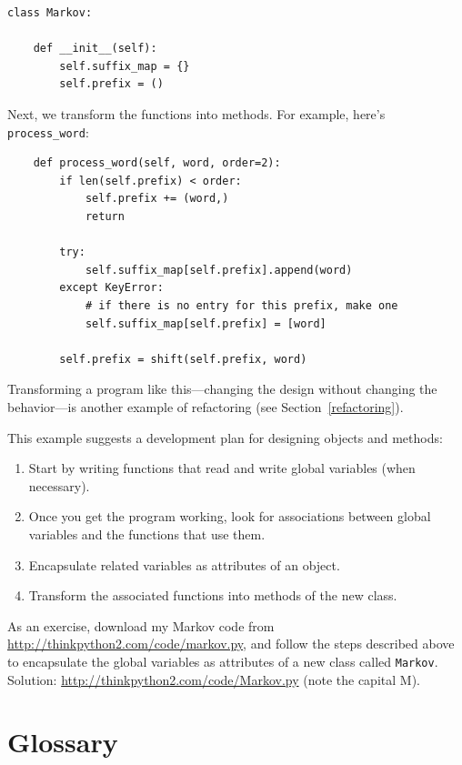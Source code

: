 \documentclass[10pt]{book}
\begin{document}
\begin{verbatim}
class Markov:

    def __init__(self):
        self.suffix_map = {}
        self.prefix = ()    
\end{verbatim}

Next, we transform the functions into methods.  For example,
here's \verb"process_word":

\begin{verbatim}
    def process_word(self, word, order=2):
        if len(self.prefix) < order:
            self.prefix += (word,)
            return

        try:
            self.suffix_map[self.prefix].append(word)
        except KeyError:
            # if there is no entry for this prefix, make one
            self.suffix_map[self.prefix] = [word]

        self.prefix = shift(self.prefix, word)        
\end{verbatim}

Transforming a program like this---changing the design without
changing the behavior---is another example of refactoring
(see Section~\ref{refactoring}).

This example suggests a development plan for designing objects and
methods:

\begin{enumerate}

\item Start by writing functions that read and write global
variables (when necessary).

\item Once you get the program working, look for associations
between global variables and the functions that use them.

\item Encapsulate related variables as attributes of an object.

\item Transform the associated functions into methods of the new
class.

\end{enumerate}

As an exercise, download my Markov code from
\url{http://thinkpython2.com/code/markov.py}, and follow the steps
described above to encapsulate the global variables as attributes of a
new class called {\tt Markov}.  Solution:
\url{http://thinkpython2.com/code/Markov.py} (note the capital M).


\section{Glossary}
\end{document}
